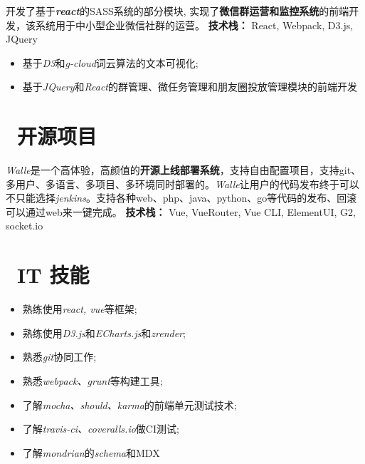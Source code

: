 \documentclass{resume}
\begin{document}
\begin{onehalfspacing}
开发了基于\textit{\textbf{react}}的SASS系统的部分模块, 实现了\textbf{微信群运营和监控系统}的前端开发，该系统用于中小型企业微信社群的运营。
\textbf{技术栈：} React, Webpack, D3.js, JQuery
\begin{itemize}
  \item 基于\textit{D3}和\textit{g-cloud}词云算法的文本可视化;
  \item 基于\textit{JQuery}和\textit{React}的群管理、微任务管理和朋友圈投放管理模块的前端开发
\end{itemize}
\end{onehalfspacing}


\section{\faUsers\ 开源项目}

\begin{onehalfspacing}
\textit{Walle}是一个高体验，高颜值的\textbf{开源上线部署系统}，支持自由配置项目，支持git、多用户、多语言、多项目、多环境同时部署的。\textit{Walle}让用户的代码发布终于可以不只能选择\textit{jenkins}。支持各种web、php、java、python、go等代码的发布、回滚可以通过web来一键完成。
\textbf{技术栈：} Vue, VueRouter, Vue CLI, ElementUI, G2, socket.io
\end{onehalfspacing}

\section{\faCogs\ IT 技能}
\begin{itemize}[parsep=0.5ex]
  \item 熟练使用\textit{react, vue}等框架;
  \item 熟练使用\textit{D3.js}和\textit{ECharts.js}和\textit{zrender};
  \item 熟悉\textit{git}协同工作;
  \item 熟悉\textit{webpack、grunt}等构建工具;
  \item 了解\textit{mocha、should、karma}的前端单元测试技术;
  \item 了解\textit{travis-ci、coveralls.io}做CI测试;
  \item 了解\textit{mondrian}的\textit{schema}和MDX
\end{itemize}
\end{document}
